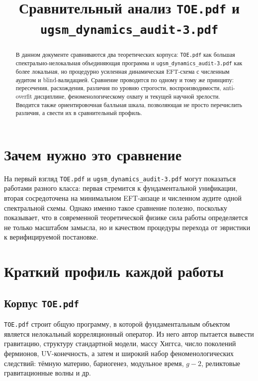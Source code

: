 \documentclass[12pt,a4paper]{article}
\title{Сравнительный анализ \texttt{TOE.pdf} и \texttt{ugsm\_dynamics\_audit-3.pdf}}
\author{}
\date{}
\begin{document}
\maketitle

\begin{abstract}
В данном документе сравниваются два теоретических корпуса: \texttt{TOE.pdf} как большая спектрально-нелокальная объединяющая программа и \texttt{ugsm\_dynamics\_audit-3.pdf} как более локальная, но процедурно усиленная динамическая EFT-схема с численным аудитом и blind-валидацией. Сравнение проводится по одному и тому же принципу: пересечения, расхождения, различия по уровню строгости, воспроизводимости, anti-overfit дисциплине, феноменологическому охвату и текущей научной зрелости. Вводится также ориентировочная балльная шкала, позволяющая не просто перечислить различия, а свести их в сравнительный профиль.
\end{abstract}

\section{Зачем нужно это сравнение}

На первый взгляд \texttt{TOE.pdf} и \texttt{ugsm\_dynamics\_audit-3.pdf} могут показаться работами разного класса: первая стремится к фундаментальной унификации, вторая сосредоточена на минимальном EFT-анзаце и численном аудите одной спектральной схемы. Однако именно такое сравнение полезно, поскольку показывает, что в современной теоретической физике сила работы определяется не только масштабом замысла, но и качеством процедуры перехода от эвристики к верифицируемой постановке.

\section{Краткий профиль каждой работы}

\subsection{Корпус \texttt{TOE.pdf}}

\texttt{TOE.pdf} строит общую программу, в которой фундаментальным объектом является нелокальный корреляционный оператор. Из него автор пытается вывести гравитацию, структуру стандартной модели, массу Хиггса, число поколений фермионов, UV-конечность, а затем и широкий набор феноменологических следствий: тёмную материю, бариогенез, модульное время, \(g-2\), реликтовые гравитационные волны и др.
\end{document}
